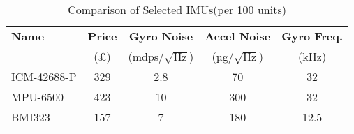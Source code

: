 \begin{table}[h]
  \centering
  \begin{tabular}{lcccc}
    \toprule
    \textbf{Name} & \textbf{Price} & \textbf{Gyro Noise} & \textbf{Accel Noise} & \textbf{Gyro Freq.} \\
    & (£) & (mdps/$\sqrt{\text{Hz}}$) & (µg/$\sqrt{\text{Hz}}$) & (kHz) \\
    \midrule
    ICM-42688-P\cite{tdk_icm42688p} & 329 & 2.8 & 70 & 32 \\
    MPU-6500\cite{tdk_mpu6500}& 423 & 10  & 300 & 32 \\
    BMI323\cite{bosch_bmi323} & 157 & 7   & 180 & 12.5 \\
    \bottomrule
  \end{tabular}
  \caption{Comparison of Selected IMUs(per 100 units)}
  \label{tab:imu-comparison}
\end{table}
